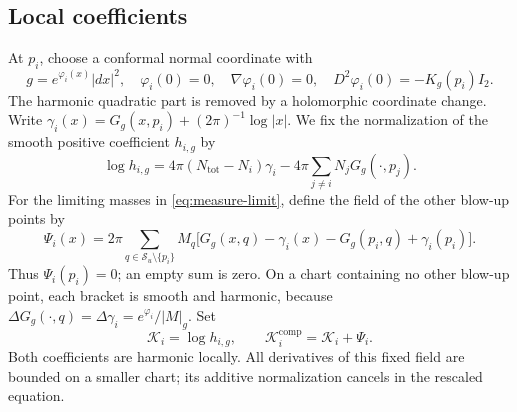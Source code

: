 \documentclass[11pt,reqno]{amsart}
\numberwithin{equation}{section}
\theoremstyle{definition}
\theoremstyle{remark}
\newcommand{\cS}{\mathcal S}
\newcommand{\comp}{\mathrm{comp}}
\newcommand{\tot}{\mathrm{tot}}
\begin{document}
\subsection{Local coefficients}
At $p_i$, choose a conformal normal coordinate with
\begin{equation}\label{eq:isothermal}
 g=e^{\varphi_i(x)}|dx|^2,\quad \varphi_i(0)=0,\quad
 \nabla\varphi_i(0)=0,\quad D^2\varphi_i(0)=-K_g(p_i)I_2.
\end{equation}
The harmonic quadratic part is removed by a holomorphic coordinate
change. Write $\gamma_i(x)=G_g(x,p_i)+(2\pi)^{-1}\log|x|$.
We fix the normalization of the smooth positive coefficient $h_{i,g}$ by
\begin{equation}\label{eq:explicit-fixed-coefficient}
 \log h_{i,g}=4\pi(N_{\tot}-N_i)\gamma_i
               -4\pi\sum_{j\ne i}N_jG_g(\cdot,p_j).
\end{equation}
For the limiting masses in \eqref{eq:measure-limit}, define the field
of the other blow-up points by
\begin{equation}\label{eq:other-core-harmonic-field}
 \Psi_i(x)=2\pi\sum_{q\in\cS_u\setminus\{p_i\}}M_q
 \bigl[G_g(x,q)-\gamma_i(x)-G_g(p_i,q)+\gamma_i(p_i)\bigr].
\end{equation}
Thus $\Psi_i(p_i)=0$; an empty sum is zero. On a chart containing no
other blow-up point, each bracket is smooth and harmonic, because
$\Delta G_g(\cdot,q)=\Delta\gamma_i=e^{\varphi_i}/|M|_g$.
Set
\begin{equation}\label{eq:fixed-K}
 \mathcal K_i=\log h_{i,g},\qquad
 \mathcal K_i^{\comp}=\mathcal K_i+\Psi_i.
\end{equation}
Both coefficients are harmonic locally. All derivatives of this fixed
field are bounded on a smaller chart; its additive normalization
cancels in the rescaled equation.
\end{document}
